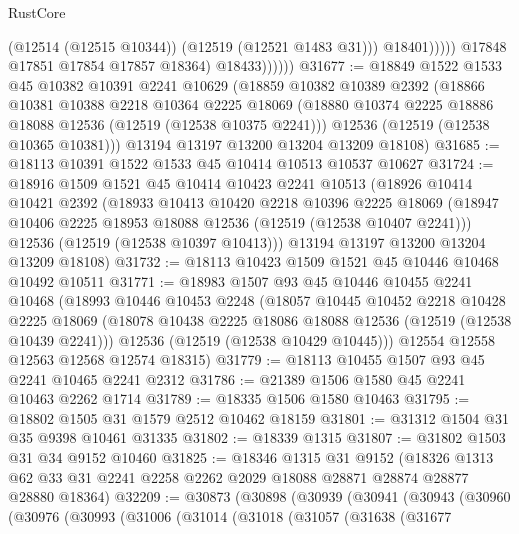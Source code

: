\begin{lexlean}{RustCore}
\begin{coremodule}
                              (@12514 (@12515 @10344))
                              (@12519 (@12521 @1483 @31)))
                            @18401)))))
                  @17848
                  @17851
                  @17854
                  @17857
                  @18364)
                @18433))))))
@31677 := @18849
    @1522
    @1533
    @45
    @10382
    @10391
    @2241
    @10629
    (@18859
      @10382
      @10389
      @2392
      (@18866
        @10381
        @10388
        @2218
        @10364
        @2225
        @18069
        (@18880 @10374 @2225 @18886 @18088 @12536 (@12519 (@12538 @10375 @2241)))
        @12536
        (@12519 (@12538 @10365 @10381)))
      @13194
      @13197
      @13200
      @13204
      @13209
      @18108)
@31685 := @18113 @10391 @1522 @1533 @45 @10414 @10513 @10537 @10627
@31724 := @18916
    @1509
    @1521
    @45
    @10414
    @10423
    @2241
    @10513
    (@18926
      @10414
      @10421
      @2392
      (@18933
        @10413
        @10420
        @2218
        @10396
        @2225
        @18069
        (@18947 @10406 @2225 @18953 @18088 @12536 (@12519 (@12538 @10407 @2241)))
        @12536
        (@12519 (@12538 @10397 @10413)))
      @13194
      @13197
      @13200
      @13204
      @13209
      @18108)
@31732 := @18113 @10423 @1509 @1521 @45 @10446 @10468 @10492 @10511
@31771 := @18983
    @1507
    @93
    @45
    @10446
    @10455
    @2241
    @10468
    (@18993
      @10446
      @10453
      @2248
      (@18057
        @10445
        @10452
        @2218
        @10428
        @2225
        @18069
        (@18078 @10438 @2225 @18086 @18088 @12536 (@12519 (@12538 @10439 @2241)))
        @12536
        (@12519 (@12538 @10429 @10445)))
      @12554
      @12558
      @12563
      @12568
      @12574
      @18315)
@31779 := @18113 @10455 @1507 @93 @45 @2241 @10465 @2241 @2312
@31786 := @21389 @1506 @1580 @45 @2241 @10463 @2262 @1714
@31789 := @18335 @1506 @1580 @10463
@31795 := @18802 @1505 @31 @1579 @2512 @10462 @18159
@31801 := @31312 @1504 @31 @35 @9398 @10461 @31335
@31802 := @18339 @1315
@31807 := @31802 @1503 @31 @34 @9152 @10460
@31825 := @18346
    @1315
    @31
    @9152
    (@18326 @1313 @62 @33 @31 @2241 @2258 @2262 @2029 @18088 @28871 @28874 @28877 @28880 @18364)
@32209 := @30873
    (@30898
      (@30939
        (@30941
          (@30943
            (@30960
              (@30976
                (@30993
                  (@31006
                    (@31014
                      (@31018
                        (@31057
                          (@31638
                            (@31677

\end{coremodule}
\end{lexlean}
